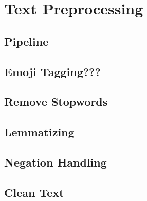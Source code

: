 
\section{Text Preprocessing}

\subsection{Pipeline}


\subsection{Emoji Tagging???}

\subsection{Remove Stopwords}

\subsection{Lemmatizing}

\subsection{Negation Handling}

\subsection{Clean Text}

